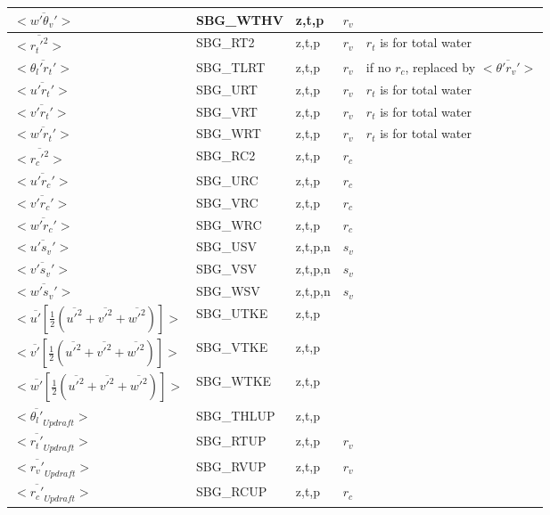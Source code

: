 \begin{center}
\begin{tabular}{||p{6cm}|>{\centering}p{2.5cm}|>{\centering}p{1.5cm}|>{\centering}p{0.5cm}|p{5cm }||}
\hline
\hline
$<\overline{w'\theta_v'}>$ & SBG\_WTHV &z,t,p & $r_v$  &  \\
\hline
$<\overline{r_t'^2}>$ & SBG\_RT2 &z,t,p & $r_v$  & $r_t$ is for total water \\
\hline
$<\overline{\theta_l'r_t'}>$ & SBG\_TLRT &z,t,p & $r_v$   & if no $r_c$, replaced by $<\overline{\theta'r_v'}>$ \\
\hline
$<\overline{u'r_t'}>$ & SBG\_URT &z,t,p & $r_v$  & $r_t$ is for total water\\
\hline
$<\overline{v'r_t'}>$ & SBG\_VRT &z,t,p & $r_v$  &$r_t$ is for total water \\
\hline
$<\overline{w'r_t'}>$ & SBG\_WRT &z,t,p & $r_v$  &$r_t$ is for total water \\
\hline
$<\overline{r_c'^2}>$ & SBG\_RC2 &z,t,p & $r_c$  & \\
\hline
$<\overline{u'r_c'}>$ & SBG\_URC &z,t,p & $r_c$  & \\
\hline
$<\overline{v'r_c'}>$ & SBG\_VRC &z,t,p & $r_c$  & \\
\hline
$<\overline{w'r_c'}>$ & SBG\_WRC &z,t,p & $r_c$  & \\
\hline
$<\overline{u's_v'}>$ & SBG\_USV &z,t,p,n & $s_v$  & \\
\hline
$<\overline{v's_v'}>$ & SBG\_VSV &z,t,p,n & $s_v$  & \\
\hline
$<\overline{w's_v'}>$ & SBG\_WSV &z,t,p,n & $s_v$  & \\
\hline
$<\overline{u'}\left[\frac{1}{2}(\overline{u'^2}+\overline{v'^2}+\overline{w'^2})\right]>$ & SBG\_UTKE & z,t,p &   &\\
\hline
$<\overline{v'}\left[\frac{1}{2}(\overline{u'^2}+\overline{v'^2}+\overline{w'^2})\right]>$ & SBG\_VTKE & z,t,p &   &\\
\hline
$<\overline{w'}\left[\frac{1}{2}(\overline{u'^2}+\overline{v'^2}+\overline{w'^2})\right]>$ & SBG\_WTKE & z,t,p &   &\\
\hline
$<\overline{\theta_l'}_{Updraft}>$ & SBG\_THLUP &z,t,p &   & \\
\hline
$<\overline{r_t'}_{Updraft}>$ & SBG\_RTUP &z,t,p & $r_v$  & \\
\hline
$<\overline{r_v'}_{Updraft}>$ & SBG\_RVUP &z,t,p & $r_v$  & \\
\hline
$<\overline{r_c'}_{Updraft}>$ & SBG\_RCUP &z,t,p & $r_c$  & \\

\end{tabular}
\end{center}
